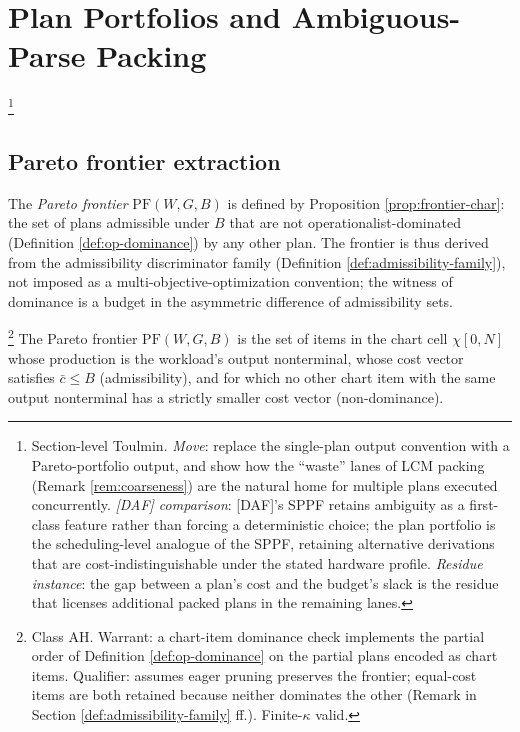 \section{Plan Portfolios and Ambiguous-Parse Packing}
\label{sec:portfolios}\footnote{Section-level Toulmin. \emph{Move}: replace the single-plan output convention with a Pareto-portfolio output, and show how the ``waste'' lanes of LCM packing (Remark \ref{rem:coarseness}) are the natural home for multiple plans executed concurrently. \emph{[DAF] comparison}: [DAF]'s SPPF retains ambiguity as a first-class feature rather than forcing a deterministic choice; the plan portfolio is the scheduling-level analogue of the SPPF, retaining alternative derivations that are cost-indistinguishable under the stated hardware profile. \emph{Residue instance}: the gap between a plan's cost and the budget's slack is the residue that licenses additional packed plans in the remaining lanes.}

\subsection{Pareto frontier extraction}

\begin{definition}
  \label{def:pareto}
  The \emph{Pareto frontier} $\mathrm{PF}(W, G, B)$ is
  defined by Proposition \ref{prop:frontier-char}: the
  set of plans admissible under $B$ that are not
  operationalist-dominated (Definition
  \ref{def:op-dominance}) by any other plan. The
  frontier is thus derived from the admissibility
  discriminator family (Definition
  \ref{def:admissibility-family}), not imposed as a
  multi-objective-optimization convention; the witness
  of dominance is a budget in the asymmetric
  difference of admissibility sets.
\end{definition}

\begin{proposition}
  \label{prop:pareto}
  \footnote{Class \textsf{AH}. Warrant: a chart-item
  dominance check implements the partial order of
  Definition \ref{def:op-dominance} on the partial
  plans encoded as chart items. Qualifier: assumes
  eager pruning preserves the frontier; equal-cost
  items are both retained because neither dominates
  the other (Remark in
  Section \ref{def:admissibility-family} ff.).
  Finite-$\kappa$ valid.}
  The Pareto frontier $\mathrm{PF}(W, G, B)$ is the
  set of items in the chart cell $\chi[0, N]$ whose
  production is the workload's output nonterminal,
  whose cost vector satisfies $\bar{c} \leq B$
  (admissibility), and for which no other chart item
  with the same output nonterminal has a strictly
  smaller cost vector (non-dominance).
\end{proposition}

